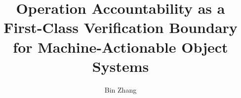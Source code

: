\documentclass[conference]{IEEEtran}
\title{Operation Accountability as a First-Class Verification Boundary for Machine-Actionable Object Systems}
\author{Bin Zhang}
\begin{document}
\maketitle

\begin{abstract}

\end{abstract}





\end{document}
